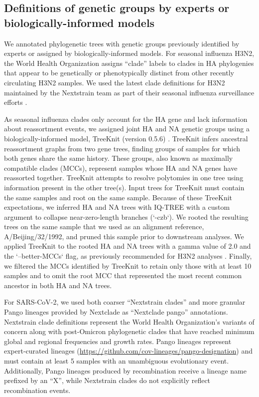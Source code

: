 \documentclass[10pt,letterpaper]{article}
\begin{document}
\subsection*{Definitions of genetic groups by experts or biologically-informed models}

We annotated phylogenetic trees with genetic groups previously identified by experts or assigned by biologically-informed models.
For seasonal influenza H3N2, the World Health Organization assigns ``clade'' labels to clades in HA phylogenies that appear to be genetically or phenotypically distinct from other recently circulating H3N2 samples.
We used the latest clade definitions for H3N2 maintained by the Nextstrain team as part of their seasonal influenza surveillance efforts \cite{Neher2015}.

As seasonal influenza clades only account for the HA gene and lack information about reassortment events, we assigned joint HA and NA genetic groups using a biologically-informed model, TreeKnit (version 0.5.6) \cite{Barrat-Charlaix2022}.
TreeKnit infers ancestral reassortment graphs from two gene trees, finding groups of samples for which both genes share the same history.
These groups, also known as maximally compatible clades (MCCs), represent samples whose HA and NA genes have reassorted together.
TreeKnit attempts to resolve polytomies in one tree using information present in the other tree(s).
Input trees for TreeKnit must contain the same samples and root on the same sample.
Because of these TreeKnit expectations, we inferred HA and NA trees with IQ-TREE with a custom argument to collapse near-zero-length branches (`-czb`).
We rooted the resulting trees on the same sample that we used as an alignment reference, A/Beijing/32/1992, and pruned this sample prior to downstream analyses.
We applied TreeKnit to the rooted HA and NA trees with a gamma value of 2.0 and the `--better-MCCs` flag, as previously recommended for H3N2 analyses \cite{Barrat-Charlaix2022}.
Finally, we filtered the MCCs identified by TreeKnit to retain only those with at least 10 samples and to omit the root MCC that represented the most recent common ancestor in both HA and NA trees.

For SARS-CoV-2, we used both coarser ``Nextstrain clades'' \cite{Hodcroft2020,Bedford2021,Roemer2022} and more granular Pango lineages \cite{OToole2021} provided by Nextclade as ``Nextclade pango'' annotations.
Nextstrain clade definitions represent the World Health Organization's variants of concern along with post-Omicron phylogenetic clades that have reached minimum global and regional frequencies and growth rates.
Pango lineages represent expert-curated lineages (\href{https://github.com/cov-lineages/pango-designation}{https://github.com/cov-lineages/pango-designation}) and must contain at least 5 samples with an unambiguous evolutionary event.
Additionally, Pango lineages produced by recombination receive a lineage name prefixed by an ``X'', while Nextstrain clades do not explicitly reflect recombination events.
\end{document}
